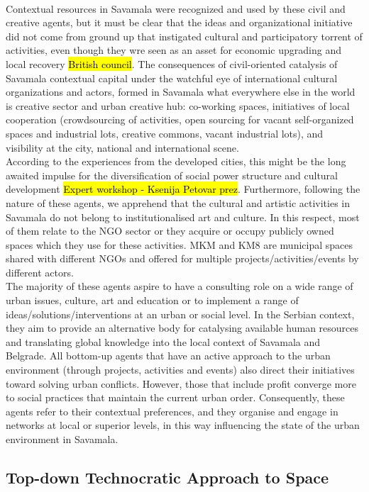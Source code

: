 \documentclass[11pt]{report}
\begin{document}
\\
Contextual resources in Savamala were recognized and used by these civil and creative agents, but it must be clear that the ideas and organizational initiative  did not come from ground up that instigated cultural and participatory torrent of activities, even though they wre seen as an asset for economic upgrading and local recovery \hl{British council}.
The consequences of civil-oriented catalysis of Savamala contextual capital under the watchful eye of international cultural organizations and actors, formed in Savamala what everywhere else in the world is creative sector and urban creative hub: co-working spaces, initiatives of local cooperation (crowdsourcing of activities, open sourcing for vacant self-organized spaces and industrial lots, creative commons, vacant industrial lots), and visibility at the city, national and international scene.
\\
According to the experiences from the developed cities, this might be the long awaited impulse for the diversification of social power structure and cultural development \hl{Expert workshop - Ksenija Petovar prez}.
Furthermore, following the nature of these agents, we apprehend that the cultural and artistic activities in Savamala do not belong to institutionalised art and culture. In this respect, most of them relate to the NGO sector or they acquire or occupy publicly owned spaces which they use for these activities. MKM and KM8 are municipal spaces shared with different NGOs and offered for multiple projects/activities/events by different actors.
\\
The majority of these agents aspire to have a consulting role on a wide range of urban issues, culture, art and education or to implement a range of ideas/solutions/interventions at an urban or social level.
In the Serbian context, they aim to provide an alternative body for catalysing available human resources and translating global knowledge into the local context of Savamala and Belgrade.
All bottom-up agents that have an active approach to the urban environment (through projects, activities and events) also direct their initiatives toward solving urban conflicts. However, those that include profit converge more to social practices that maintain the current urban order. Consequently, these agents refer to their contextual preferences, and they organise and engage in networks at local or superior levels, in this way influencing the state of the urban environment in Savamala.
    
\subsection{Top-down Technocratic Approach to Space}
\end{document}
